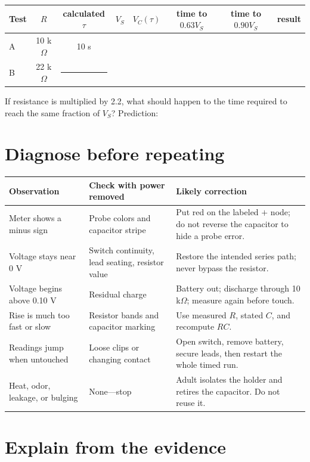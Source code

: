 \begin{center}\small
\begin{tabularx}{\linewidth}{@{}lCCCCCCL@{}}
\toprule
Test & \(R\) & calculated \(\tau\) & \(V_S\) & \(V_C(\tau)\) &
time to \(0.63V_S\) & time to \(0.90V_S\) & result\\
\midrule
A & 10 k\(\Omega\) & 10 s & & & & &\\[1.1em]
B & 22 k\(\Omega\) & \rule{.8cm}{.3pt} & & & & &\\
\bottomrule
\end{tabularx}
\end{center}

\begin{predict}
If resistance is multiplied by 2.2, what should happen to the time required to
reach the same fraction of \(V_S\)? Prediction: \blankline
\end{predict}

\section{Diagnose before repeating}

\begin{tabularx}{\linewidth}{@{}p{.26\linewidth}LL@{}}
\toprule
Observation & Check with power removed & Likely correction\\
\midrule
Meter shows a minus sign & Probe colors and capacitor stripe & Put red on
the labeled \(+\) node; do not reverse the capacitor to hide a probe error.\\
Voltage stays near 0 V & Switch continuity, lead seating, resistor value &
Restore the intended series path; never bypass the resistor.\\
Voltage begins above 0.10 V & Residual charge & Battery out; discharge through
10 k\(\Omega\); measure again before touch.\\
Rise is much too fast or slow & Resistor bands and capacitor marking &
Use measured \(R\), stated \(C\), and recompute \(RC\).\\
Readings jump when untouched & Loose clips or changing contact & Open switch,
remove battery, secure leads, then restart the whole timed run.\\
Heat, odor, leakage, or bulging & None—stop & Adult isolates the holder and
retires the capacitor. Do not reuse it.\\
\bottomrule
\end{tabularx}

\section{Explain from the evidence}

